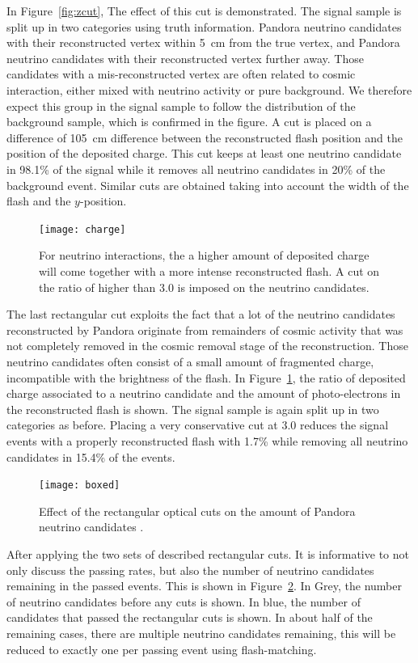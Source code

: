 In Figure~\ref{fig:zcut}, The effect of this cut is demonstrated. The signal sample is split up in two categories using truth information. Pandora neutrino candidates with their reconstructed vertex within \SI{5}{\cm} from the true vertex, and Pandora neutrino candidates with their reconstructed vertex further away. Those candidates with a mis-reconstructed vertex are often related to cosmic interaction, either mixed with neutrino activity or pure background. We therefore expect this group in the signal sample to follow the distribution of the background sample, which is confirmed in the figure. A cut is placed on a difference of \SI{105}{\cm} difference between the reconstructed flash position and the position of the deposited charge. This cut keeps at least one neutrino candidate in 98.1\% of the signal while it removes all neutrino candidates in 20\% of the background event. 
Similar cuts are obtained taking into account the width of the flash and the $y$-position. 

\begin{figure}[!htbp]
\centering
\texttt{[image: charge]}
\caption{For neutrino interactions, the a higher amount of deposited charge will come together with a more intense reconstructed flash. A cut on the ratio of higher than 3.0 is imposed on the neutrino candidates.} 
\label{fig:charge}
\end{figure}

The last rectangular cut exploits the fact that a lot of the neutrino candidates reconstructed by Pandora originate from remainders of cosmic activity that was not completely removed in the cosmic removal stage of the reconstruction. Those neutrino candidates often consist of a small amount of fragmented charge, incompatible with the brightness of the flash. In Figure~\ref{fig:charge}, the ratio of deposited charge associated to a neutrino candidate and the  amount of photo-electrons in the reconstructed flash is shown. The signal sample is again split up in two categories as before. Placing a very conservative cut at 3.0 reduces the signal events with a properly reconstructed flash with 1.7\% while removing all neutrino candidates in 15.4\% of the events. 

\begin{figure}[!htbp]
\centering
\texttt{[image: boxed]}
\caption{Effect of the rectangular optical cuts on the amount of Pandora neutrino candidates .} 
\label{fig:boxed}
\end{figure}

After applying the two sets of described rectangular cuts. It is informative to not only discuss the passing rates, but also the number of neutrino candidates remaining in the passed events. This is shown in Figure~\ref{fig:boxed}. In Grey, the number of neutrino candidates before any cuts is shown. In blue, the number of candidates that passed the rectangular cuts is shown. In about half of the remaining cases, there are multiple neutrino candidates remaining, this will be reduced to exactly one per passing event using flash-matching. 

